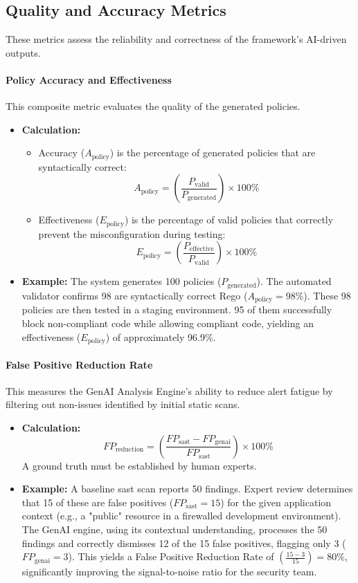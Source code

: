 \subsection*{Quality and Accuracy Metrics}
These metrics assess the reliability and correctness of the framework's AI-driven outputs.

\paragraph{Policy Accuracy and Effectiveness} This composite metric evaluates the quality of the generated policies.
\begin{itemize}
    \item \textbf{Calculation:}
        \begin{itemize}
            \item Accuracy (\( A_{\text{policy}} \)) is the percentage of generated policies that are syntactically correct:
            \[ A_{\text{policy}} = \left(\frac{P_{\text{valid}}}{P_{\text{generated}}}\right) \times 100\% \]
            \item Effectiveness (\( E_{\text{policy}} \)) is the percentage of valid policies that correctly prevent the misconfiguration during testing:
            \[ E_{\text{policy}} = \left(\frac{P_{\text{effective}}}{P_{\text{valid}}}\right) \times 100\% \]
        \end{itemize}
    \item \textbf{Example:} The system generates 100 policies (\( P_{\text{generated}} \)). The automated validator confirms 98 are syntactically correct Rego (\( A_{\text{policy}} = 98\% \)). These 98 policies are then tested in a staging environment. 95 of them successfully block non-compliant code while allowing compliant code, yielding an effectiveness (\( E_{\text{policy}} \)) of approximately 96.9\%.
\end{itemize}

\paragraph{False Positive Reduction Rate} This measures the GenAI Analysis Engine's ability to reduce alert fatigue by filtering out non-issues identified by initial static scans.
\begin{itemize}
    \item \textbf{Calculation:} \[ FP_{\text{reduction}} = \left(\frac{FP_{\text{sast}} - FP_{\text{genai}}}{FP_{\text{sast}}}\right) \times 100\% \] A ground truth must be established by human experts.
    \item \textbf{Example:} A baseline \gls{sast} scan reports 50 findings. Expert review determines that 15 of these are false positives (\( FP_{\text{sast}} = 15 \)) for the given application context (e.g., a "public" resource in a firewalled development environment). The GenAI engine, using its contextual understanding, processes the 50 findings and correctly dismisses 12 of the 15 false positives, flagging only 3 (\( FP_{\text{genai}} = 3 \)). This yields a False Positive Reduction Rate of \( \left(\frac{15 - 3}{15}\right) = 80\% \), significantly improving the signal-to-noise ratio for the security team.
\end{itemize}

